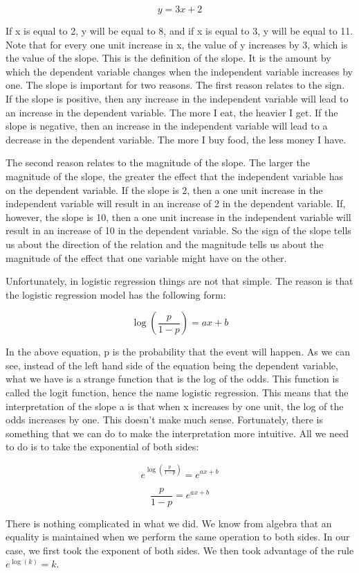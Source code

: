\documentclass[a4paper,12pt,oneside]{book}
\begin{document}
$$y=3x+2$$

If x is equal to 2, y will be equal to 8, and if x is equal to 3, y will be equal to 11. Note that for every one unit increase in x, the value of y increases by 3, which is the value of the slope. 
This is the definition of the slope. It is the amount by which the dependent variable changes when the independent variable increases by one. The slope is important for two reasons. The first reason 
relates to the sign. If the slope is positive, then any increase in the independent variable will lead to an increase in the dependent variable. The more I eat, the heavier I get. If the slope is negative, 
then an increase in the independent variable will lead to a decrease in the dependent variable. The more I buy food, the less money I have.

The second reason relates to the magnitude of the slope. The larger the magnitude of the slope, the greater the effect that the independent variable has on the dependent variable. If the slope is 2, then a one unit 
increase in the independent variable will result in an increase of 2 in the dependent variable. If, however, the slope is 10, then a one unit increase in the independent variable will result in an increase of 10 
in the dependent variable. So the sign of the slope tells us about the direction of the relation and the magnitude tells us about the magnitude of the effect that one variable might have on the other.

Unfortunately, in logistic regression things are not that simple. The reason is that the logistic regression model has the following form:

$$ \log(\frac{p}{1-p})=ax+b $$

In the above equation, p is the probability that the event will happen. As we can see, instead of the left hand side of the equation being the dependent variable, what we have is a strange function that is the log 
of the odds. This function is called the logit function, hence the name logistic regression. This means that the interpretation of the slope a is that when x increases by one unit, the log of the odds increases by one. 
This doesn’t make much sense. Fortunately, there is something that we can do to make the interpretation more intuitive. All we need to do is to take the exponential of both sides:

$$ e^{\log(\frac{p}{1-p})}=e^{ax+b} $$

$$ \frac{p}{1-p}=e^{ax+b} $$

There is nothing complicated in what we did. We know from algebra that an equality is maintained when we perform the same operation to both sides. In our case, we first took the exponent of both sides. 
We then took advantage of the rule $e^{\log(k)}=k$.
\end{document}
